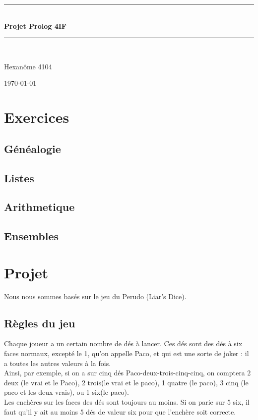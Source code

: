 \documentclass{article}
\newcommand{\HRule}{\rule{\linewidth}{0.5mm}}
\begin{document}
\begin{titlepage}
\begin{center}

\HRule \\[0.4cm]
{\huge \bfseries Projet Prolog 4IF}
\HRule \\[1.5cm]

\begin{minipage}{0.8\textwidth}
\center
\large
Hexanôme 4104
\end{minipage}

\vfill

{\large \today}

\end{center}
\end{titlepage}

\section{Exercices}

\subsection{Généalogie}


\subsection{Listes}


\subsection{Arithmetique}


\subsection{Ensembles}


\section{Projet}

Nous nous sommes basés sur le jeu du Perudo (Liar's Dice).

\subsection{Règles du jeu}
Chaque joueur a un certain nombre de dés à lancer.  Ces dés sont des dés à six
faces normaux, excepté le 1, qu'on appelle Paco, et qui est une sorte de joker :
il a toutes les autres valeurs à la fois.
\\
Ainsi, par exemple, si on a sur
cinq dés Paco-deux-trois-cinq-cinq, on comptera 2 deux (le vrai et le Paco), 2
trois(le vrai et le paco), 1 quatre (le paco), 3 cinq (le paco et les deux
vrais), ou 1 six(le paco).
\\
Les enchères sur les faces des dés sont toujours au moins. Si on parie sur 5
six, il faut qu'il y ait au moins 5 dés de valeur six pour que l'enchère soit
correcte.
\end{document}
